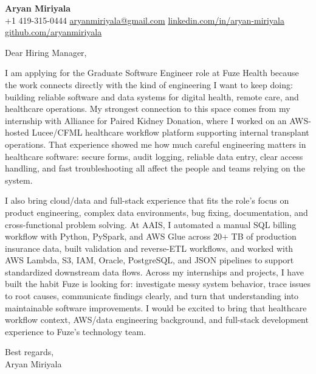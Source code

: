 \documentclass[letterpaper,11pt]{article}
\begin{document}
\begin{center}
    {\Large \textbf{Aryan Miriyala}}\\
    \vspace{2pt}
    +1 419-315-0444 \textbar{} \href{mailto:aryanmiriyala@gmail.com}{aryanmiriyala@gmail.com} \textbar{} \href{https://www.linkedin.com/in/aryan-miriyala-7788a21b6/}{linkedin.com/in/aryan-miriyala} \textbar{} \href{https://github.com/aryanmiriyala}{github.com/aryanmiriyala}
\end{center}

\vspace{10pt}

Dear Hiring Manager,

I am applying for the Graduate Software Engineer role at Fuze Health because the work connects directly with the kind of engineering I want to keep doing: building reliable software and data systems for digital health, remote care, and healthcare operations. My strongest connection to this space comes from my internship with Alliance for Paired Kidney Donation, where I worked on an AWS-hosted Lucee/CFML healthcare workflow platform supporting internal transplant operations. That experience showed me how much careful engineering matters in healthcare software: secure forms, audit logging, reliable data entry, clear access handling, and fast troubleshooting all affect the people and teams relying on the system.

I also bring cloud/data and full-stack experience that fits the role's focus on product engineering, complex data environments, bug fixing, documentation, and cross-functional problem solving. At AAIS, I automated a manual SQL billing workflow with Python, PySpark, and AWS Glue across 20+ TB of production insurance data, built validation and reverse-ETL workflows, and worked with AWS Lambda, S3, IAM, Oracle, PostgreSQL, and JSON pipelines to support standardized downstream data flows. Across my internships and projects, I have built the habit Fuze is looking for: investigate messy system behavior, trace issues to root causes, communicate findings clearly, and turn that understanding into maintainable software improvements. I would be excited to bring that healthcare workflow context, AWS/data engineering background, and full-stack development experience to Fuze's technology team.

\vspace{8pt}

Best regards,\\
Aryan Miriyala
\end{document}

